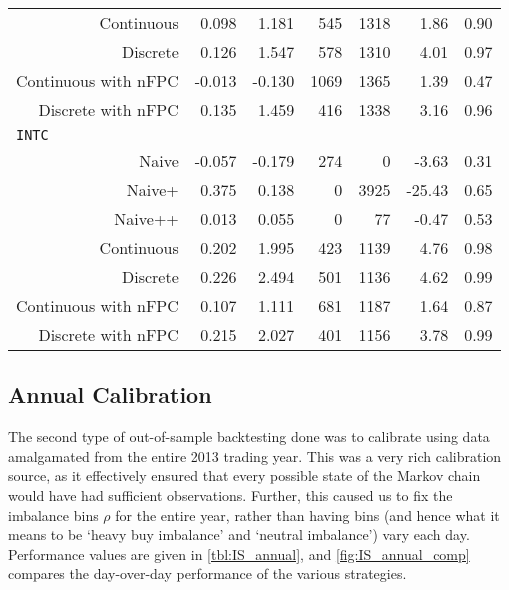 \begin{table}
\begin{tabular}{@{} *{7}{r} @{}}
Continuous & 0.098 & 1.181 & 545 & 1318 & 1.86 & 0.90 \\
Discrete & 0.126 & 1.547 & 578 & 1310 & 4.01 & 0.97 \\
Continuous with nFPC & -0.013 & -0.130 & 1069 & 1365 & 1.39 & 0.47 \\
Discrete with nFPC & 0.135 & 1.459 & 416 & 1338 & 3.16 & 0.96 \\[2ex]
\multicolumn{7}{l}{\texttt{INTC}} \\ 
Naive & -0.057 & -0.179 & 274 & 0 & -3.63 & 0.31 \\
Naive+ & 0.375 & 0.138 & 0 & 3925 & -25.43 & 0.65 \\
Naive++ & 0.013 & 0.055 & 0 & 77 & -0.47 & 0.53 \\
Continuous & 0.202 & 1.995 & 423 & 1139 & 4.76 & 0.98 \\
Discrete & 0.226 & 2.494 & 501 & 1136 & 4.62 & 0.99 \\
Continuous with nFPC & 0.107 & 1.111 & 681 & 1187 & 1.64 & 0.87 \\
Discrete with nFPC & 0.215 & 2.027 & 401 & 1156 & 3.78 & 0.99 \\
\bottomrule
\end{tabular}
\end{table}

\FloatBarrier
\subsection{Annual Calibration}
The second type of out-of-sample backtesting done was to calibrate using data amalgamated from the entire 2013 trading year. This was a very rich calibration source, as it effectively ensured that every possible state of the Markov chain would have had sufficient observations. Further, this caused us to fix the imbalance bins $\rho$ for the entire year, rather than having bins (and hence what it means to be `heavy buy imbalance' and `neutral imbalance') vary each day. Performance values are given in \autoref{tbl:IS_annual}, and \autoref{fig:IS_annual_comp} compares the day-over-day performance of the various strategies. 

